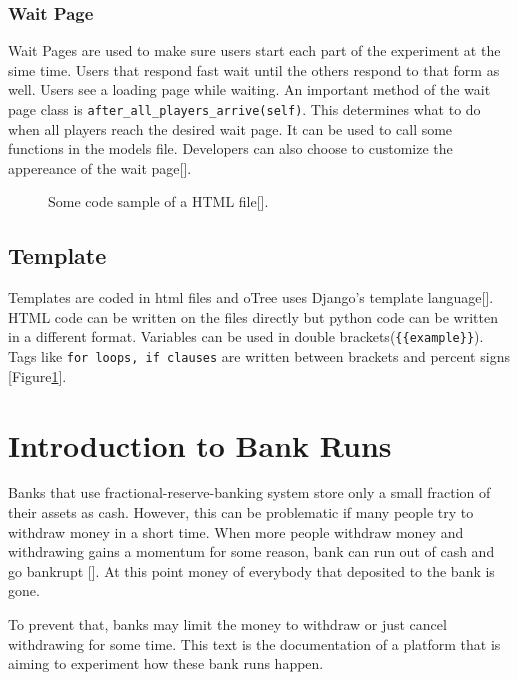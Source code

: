 \subsubsection{Wait Page}

Wait Pages are used to make sure users start each part of the experiment at the sime time. Users that respond fast wait until the others respond to that form as well. Users see a loading page while waiting. An important method of the wait page class is \verb|after_all_players_arrive(self)|. This determines what to do when all players reach the desired wait page. It can be used to call some functions in the models file. Developers can also choose to customize the appereance of the wait page[\cite{oTreeView2017}].

\begin{figure}[h]
	\centerline{}
	\caption{Some code sample of a HTML file[\cite{DjangoTemplate2017}].}
	\label{fig:picture10}
\end{figure}

\subsection{Template}

Templates are coded in html files and oTree uses Django's template language[\cite{DjangoTemplate2017}]. HTML code can be written on the files directly but python code can be written in a different format. Variables can be used in double brackets(\verb|{{example}}|). Tags like \verb|for loops, if clauses| are written between brackets and percent signs [Figure\ref{fig:picture10}]. 

\section{Introduction to Bank Runs}

Banks that use fractional-reserve-banking system store only a small fraction of their assets as cash. However, this can be problematic if many people try to withdraw money in a short time. When more people withdraw money and withdrawing gains a momentum for some reason, bank can run out of cash and go bankrupt [\cite{Diamond2007}]. At this point money of everybody that deposited to the bank is gone. 

To prevent that, banks may limit the money to withdraw or just cancel withdrawing for some time. This text is the documentation of a platform that is aiming to experiment how these bank runs happen.

